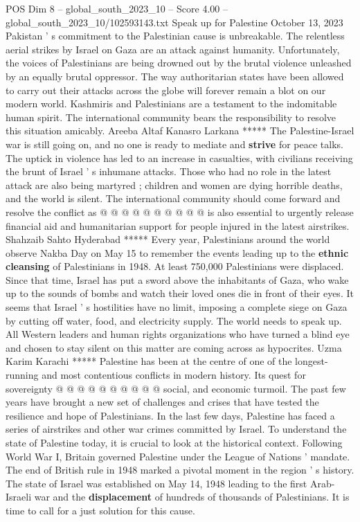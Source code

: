 \begin{textsample}{POS Dim 8 – global\_south\_2023\_10 – Score 4.00 – global\_south\_2023\_10/102593143.txt}  \label{ex:f8_pos_354}
Speak up for Palestine October 13, 2023 Pakistan ' s commitment to the Palestinian cause is unbreakable.
The relentless aerial strikes by Israel on Gaza are an attack against humanity.
Unfortunately, the voices of Palestinians are being drowned out by the brutal violence unleashed by an equally brutal oppressor.
The way authoritarian states have been allowed to carry out their attacks across the globe will forever remain a blot on our modern world.
Kashmiris and Palestinians are a testament to the indomitable human spirit.
The international community bears the responsibility to resolve this situation amicably.
Areeba Altaf Kanasro Larkana ***** The Palestine-Israel war is still going on, and no one is ready to mediate and \textbf{strive} for peace talks.
The uptick in violence has led to an increase in casualties, with civilians receiving the brunt of Israel ' s inhumane attacks.
Those who had no role in the latest attack are also being martyred ; children and women are dying horrible deaths, and the world is silent.
The international community should come forward and resolve the conflict as @ @ @ @ @ @ @ @ @ @ is also essential to urgently release financial aid and humanitarian support for people injured in the latest airstrikes.
Shahzaib Sahto Hyderabad ***** Every year, Palestinians around the world observe Nakba Day on May 15 to remember the events leading up to the \textbf{ethnic} \textbf{cleansing} of Palestinians in 1948.
At least 750,000 Palestinians were displaced.
Since that time, Israel has put a sword above the inhabitants of Gaza, who wake up to the sounds of bombs and watch their loved ones die in front of their eyes.
It seems that Israel ' s hostilities have no limit, imposing a complete siege on Gaza by cutting off water, food, and electricity supply.
The world needs to speak up.
All Western leaders and human rights organizations who have turned a blind eye and chosen to stay silent on this matter are coming across as hypocrites.
Uzma Karim Karachi ***** Palestine has been at the centre of one of the longest-running and most contentious conflicts in modern history.
Its quest for sovereignty @ @ @ @ @ @ @ @ @ @ social, and economic turmoil.
The past few years have brought a new set of challenges and crises that have tested the resilience and hope of Palestinians.
In the last few days, Palestine has faced a series of airstrikes and other war crimes committed by Israel.
To understand the state of Palestine today, it is crucial to look at the historical context.
Following World War I, Britain governed Palestine under the League of Nations ' mandate.
The end of British rule in 1948 marked a pivotal moment in the region ' s history.
The state of Israel was established on May 14, 1948 leading to the first Arab-Israeli war and the \textbf{displacement} of hundreds of thousands of Palestinians.
It is time to call for a just solution for this cause.

\end{textsample}
